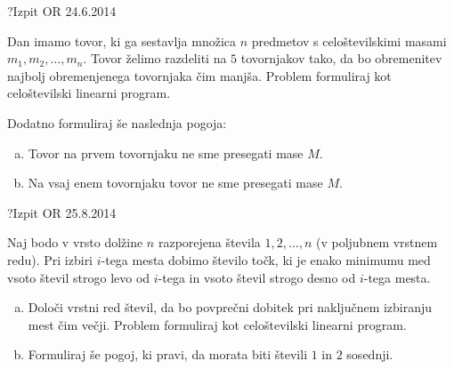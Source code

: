 \begin{naloga}{?}{Izpit OR 24.6.2014}
\begin{vprasanje}
Dan imamo tovor,
ki ga sestavlja množica $n$ predmetov
s celoštevilskimi masami $m_1, m_2, \dots, m_n$.
Tovor želimo razdeliti na $5$ tovornjakov tako,
da bo obremenitev najbolj obremenjenega tovornjaka čim manjša.
Problem formuliraj kot celoštevilski linearni program.

Dodatno formuliraj še naslednja pogoja:
\begin{enumerate}[(a)]
\item Tovor na prvem tovornjaku ne sme presegati mase $M$.
\item Na vsaj enem tovornjaku tovor ne sme presegati mase $M$.
\end{enumerate}
\end{vprasanje}
\begin{odgovor}
\end{odgovor}
\end{naloga}


\begin{naloga}{?}{Izpit OR 25.8.2014}
\begin{vprasanje}
Naj bodo v vrsto dolžine $n$ razporejena števila $1, 2, \dots, n$
(v poljubnem vrstnem redu).
Pri izbiri $i$-tega mesta dobimo število točk,
ki je enako minimumu med vsoto števil strogo levo od $i$-tega
in vsoto števil strogo desno od $i$-tega mesta.
\begin{enumerate}[(a)]
\item Določi vrstni red števil,
da bo povprečni dobitek pri naključnem izbiranju mest čim večji.
Problem formuliraj kot celoštevilski linearni program.

\item Formuliraj še pogoj, ki pravi,
da morata biti števili $1$ in $2$ sosednji.
\end{enumerate}
\end{vprasanje}
\begin{odgovor}
\end{odgovor}
\end{naloga}


